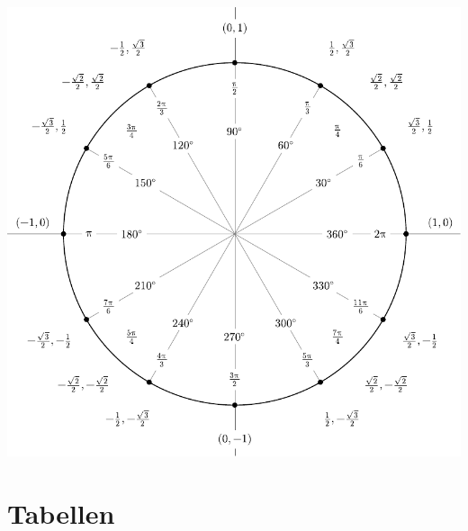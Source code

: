 \documentclass[a4paper,10pt]{article}
\begin{document}
\begin{center}
  \includegraphics[width=\linewidth]{include_degrees_circle.pdf}
  
\end{center}

\section{Tabellen}
\end{document}
